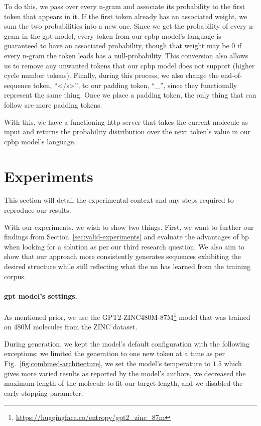\documentclass[../Document.tex]{subfiles}
\begin{document}
To do this, we pass over every n-gram and associate its probability to the first token that appears in it.
If the first token already has an associated weight, we sum the two probabilities into a new one.
Since we get the probability of every n-gram in the \gls{gpt} model, every token from our \gls{cpbp} model's language is guaranteed to have an associated probability, though that weight may be $0$ if every n-gram the token leads has a null-probability.
This conversion also allows us to remove any unwanted tokens that our \gls{cpbp} model does not support (\eg higher cycle number tokens).
Finally, during this process, we also change the end-of-sequence token, ``</s>'', to our padding token, ``\_'', since they functionally represent the same thing. Once we place a padding token, the only thing that can follow are more padding tokens. 

With this, we have a functioning \gls{http} server that takes the current molecule as input and returns the probability distribution over the next token's value in our \gls{cpbp} model's language.


\section{Experiments}
\label{sec:gptcp-experiments}
This section will detail the experimental context and any steps required to reproduce our results.

With our experiments, we wish to show two things.
First, we want to further our findings from Section~\ref{sec:valid-experiments} and evaluate the advantages of \gls{bp} when looking for a solution as per our third research question.
We also aim to show that our approach more consistently generates sequences exhibiting the desired structure while still reflecting what the \gls{nn} has learned from the training corpus.

\paragraph{\gls{gpt} model's settings.}
As mentioned prior, we use the GPT2-ZINC480M-87M\footnote{\url{https://huggingface.co/entropy/gpt2_zinc_87m}} model that was trained on 480M molecules from the ZINC dataset. 

During generation, we kept the model's default configuration with the following exceptions:
we limited the generation to one new token at a time as per Fig.~\ref{fig:combined-architecture}, 
we set the model's temperature to $1.5$ which gives more varied results as reported by the model's authors, 
we decreased the maximum length of the molecule to fit our target length, 
and we disabled the early stopping parameter.
\end{document}
